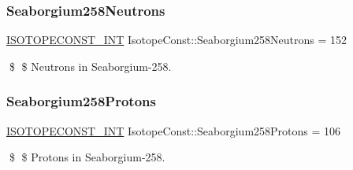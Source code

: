 \subsubsection{\texorpdfstring{Seaborgium258\+Neutrons}{Seaborgium258Neutrons}}
{\footnotesize\ttfamily \mbox{\hyperlink{group___isotope_const-_macros_ga5f18360b3e99483a35c32d789e62621c}{I\+S\+O\+T\+O\+P\+E\+C\+O\+N\+S\+T\+\_\+\+I\+NT}} Isotope\+Const\+::\+Seaborgium258\+Neutrons = 152}

\$ \$ Neutrons in Seaborgium-\/258. \mbox{\label{group___isotope_const-_seaborgium-_sg258_gacdeebbe0a20ed41d47529df2e0ccece8}} 
\subsubsection{\texorpdfstring{Seaborgium258\+Protons}{Seaborgium258Protons}}
{\footnotesize\ttfamily \mbox{\hyperlink{group___isotope_const-_macros_ga5f18360b3e99483a35c32d789e62621c}{I\+S\+O\+T\+O\+P\+E\+C\+O\+N\+S\+T\+\_\+\+I\+NT}} Isotope\+Const\+::\+Seaborgium258\+Protons = 106}

\$ \$ Protons in Seaborgium-\/258. 